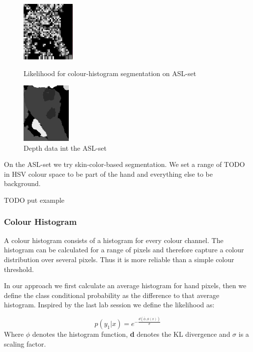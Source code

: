 \documentclass[letterpaper, 10 pt, conference]{ieeeconf}  %
\begin{document}
\begin{figure}
	\centering
	\begin{minipage}{0.4\linewidth}
		\centering
\includegraphics[height=3cm]{asl-hist-segment}
\caption{Likelihood for colour-histogram segmentation on ASL-set}
\label{fig:asl-hist-segment}
	\end{minipage}
	\hfill
	\begin{minipage}{0.4\linewidth}
		\centering
		\includegraphics[height=3cm]{asl-depth}
		\caption{Depth data int the ASL-set}
		\label{fig:asl-depth}
	\end{minipage}
\end{figure}


On the ASL-set we try skin-color-based segmentation. We set a range of TODO in HSV colour space to be part of the hand and everything else to be background.

TODO put example

\subsubsection{Colour Histogram}

A colour histogram consists of a histogram for every colour channel. The histogram can be calculated for a range of pixels and therefore capture a colour distribution over several pixels. Thus it is more reliable than a simple colour threshold.

In our approach we first calculate an average histogram for hand pixels, then we define the class conditional probability as the difference to that average histogram. Inspired by the last lab session we define the likelihood as:

\begin{equation}
p(y_1 | x) = e^{-\frac{d(\bar{\phi},\phi(x))}{\sigma}}
\label{eq:hist}
\end{equation}
Where $\phi$ denotes the histogram function, \textbf{d} denotes the KL divergence and $\sigma$ is a scaling factor.
\end{document}
